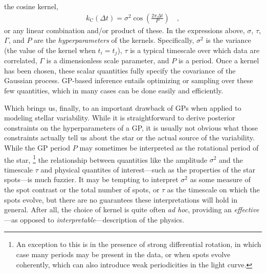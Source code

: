 \documentclass[modern]{aastex62}
\begin{document}
%
the cosine kernel,
%
\begin{align}
    k_\mathrm{C}(\Delta t) = \sigma^2 \cos\left( \frac{2\pi \Delta t}{P} \right)
    \quad,
\end{align}
%
or any linear combination and/or product of these. In the expressions above,
$\sigma$, $\tau$, $\Gamma$, and $P$ are
the \emph{hyperparameters} of the kernels.
Specifically, $\sigma^2$ is the variance (the value
of the kernel when $t_i = t_j$), $\tau$ is a typical timescale over which
data are correlated, $\Gamma$ is a dimensionless scale parameter, and $P$ is
a period. Once a kernel has been chosen, these scalar quantities fully
specify the covariance of the Gaussian process. GP-based inference
entails optimizing or sampling over these few quantities, which in many
cases can be done easily and efficiently.

Which brings us, finally, to an important drawback of GPs when applied
to modeling stellar variability. While it is straightforward to derive
posterior constraints on the hyperparameters of a GP, it is usually
not obvious what those constraints actually tell us about the star
or the actual source of the variability. While the GP period $P$
may sometimes be interpreted as the rotational period of the star,%
\footnote{An exception to this is in the presence of strong differential
    rotation, in which case many periods may be present in the data, or
    when spots evolve coherently, which can also introduce weak periodicities
    in the light curve.}
the relationship between quantities like the amplitude $\sigma^2$
and the timescale $\tau$ and physical quantites of interest---such
as the properties of the star spots---is much fuzzier.
It may be tempting to interpret $\sigma^2$ as some measure of the spot
contrast or the total number of spots, or $\tau$ as the timescale on which the
spots evolve, but there are no guarantees these interpretations will
hold in general. After all, the choice of kernel is quite often \emph{ad hoc},
providing an \emph{effective}---as opposed to \emph{interpretable}---description
of the physics.
\end{document}
